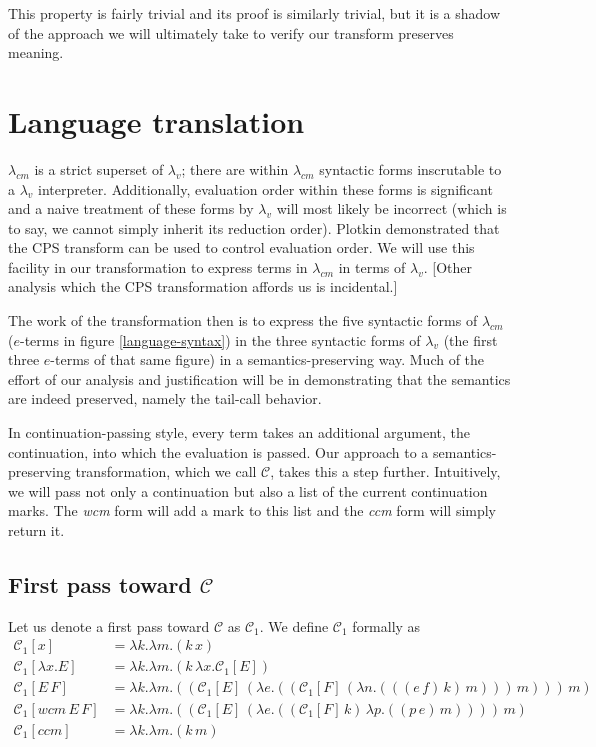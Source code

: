 \documentclass[ms,electronic,twosidetoc,letterpaper,chaptercenter,parttop]{byumsphd}
\begin{document}
This property is fairly trivial and its proof is similarly trivial, but it is a shadow of 
the approach we will ultimately take to verify our transform preserves meaning.

\section{Language translation}

$\lambda_{cm}$ is a strict superset of $\lambda_{v}$; there are within $\lambda_{cm}$
syntactic forms inscrutable to a $\lambda_{v}$ interpreter. Additionally, evaluation order
within these forms is significant and a naive treatment of these forms by $\lambda_{v}$
will most likely be incorrect (which is to say, we cannot simply inherit its reduction
order). Plotkin \cite{plotkin1975call} demonstrated that the CPS transform can be used to
control evaluation order. We will use this facility in our transformation to express terms
in $\lambda_{cm}$ in terms of $\lambda_{v}$. [Other analysis which the CPS transformation
affords us \cite{appel2007compiling} is incidental.]

The work of the transformation then is to express the five syntactic forms of
$\lambda_{cm}$ ($e$-terms in figure \ref{language-syntax}) in the three syntactic forms of
$\lambda_{v}$ (the first three $e$-terms of that same figure) in a semantics-preserving
way. Much of the effort of our analysis and justification will be in demonstrating that
the semantics are indeed preserved, namely the tail-call behavior.

In continuation-passing style, every term takes an additional argument, the continuation,
into which the evaluation is passed. Our approach to a semantics-preserving
transformation, which we call $\mathcal{C}$, takes this a step further. Intuitively, we
will pass not only a continuation but also a list of the current continuation marks. The
\emph{wcm} form will add a mark to this list and the \emph{ccm} form will simply return it.

\subsection{First pass toward $\mathcal{C}$}

Let us denote a first pass toward $\mathcal{C}$ as $\mathcal{C}_{1}$. We define 
$\mathcal{C}_{1}$ formally as 
\begin{align*}
\mathcal{C}_{1}[x]           &= \lambda k.\lambda m.(k\,x)\\
\mathcal{C}_{1}[\lambda x.E] &= \lambda k.\lambda m.(k\,\lambda x.\mathcal{C}_{1}[E])\\
\mathcal{C}_{1}[E\,F]        &= \lambda k.\lambda m.((\mathcal{C}_{1}[E]\,(\lambda e.((\mathcal{C}_{1}[F]\,(\lambda n.(((e\,f)\,k)\,m)))\,m)))\,m)\\
\mathcal{C}_{1}[wcm\,E\,F]   &= \lambda k.\lambda m.((\mathcal{C}_{1}[E]\,(\lambda e.((\mathcal{C}_{1}[F]\,k)\,\lambda p.((p\,e)\,m))))\,m)\\
\mathcal{C}_{1}[ccm]         &= \lambda k.\lambda m.(k\,m)
\end{align*}
\end{document}
